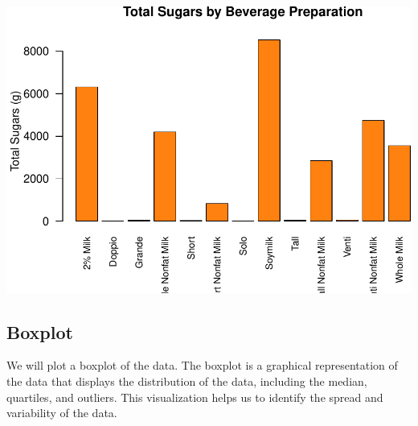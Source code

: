 \documentclass[
]{article}
\newenvironment{Shaded}{\begin{snugshade}}{\end{snugshade}}
\newcommand{\AttributeTok}[1]{\textcolor[rgb]{0.13,0.29,0.53}{#1}}
\newcommand{\DecValTok}[1]{\textcolor[rgb]{0.00,0.00,0.81}{#1}}
\newcommand{\FloatTok}[1]{\textcolor[rgb]{0.00,0.00,0.81}{#1}}
\newcommand{\FunctionTok}[1]{\textcolor[rgb]{0.13,0.29,0.53}{\textbf{#1}}}
\newcommand{\NormalTok}[1]{#1}
\newcommand{\OtherTok}[1]{\textcolor[rgb]{0.56,0.35,0.01}{#1}}
\newcommand{\SpecialCharTok}[1]{\textcolor[rgb]{0.81,0.36,0.00}{\textbf{#1}}}
\newcommand{\StringTok}[1]{\textcolor[rgb]{0.31,0.60,0.02}{#1}}
\begin{document}
\begin{Shaded}
\end{Shaded}

\begin{center}\includegraphics{Statistical_Learning_Final_Report_files/figure-latex/total_sugars-1} \end{center}

\subsection{Boxplot}\label{boxplot}

We will plot a boxplot of the data. The boxplot is a graphical
representation of the data that displays the distribution of the data,
including the median, quartiles, and outliers. This visualization helps
us to identify the spread and variability of the data.
\end{document}
